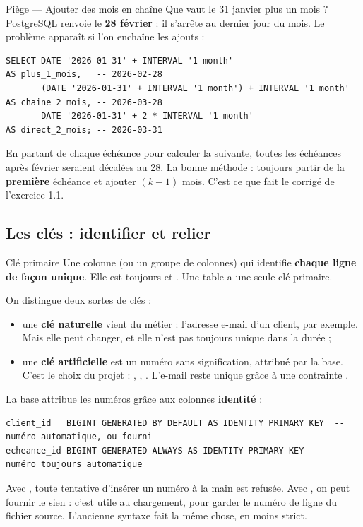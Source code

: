 \begin{piege}{Piège --- Ajouter des mois en chaîne}
Que vaut le 31 janvier plus un mois ? PostgreSQL renvoie le \textbf{28 février} : il s'arrête au
dernier jour du mois. Le problème apparaît si l'on enchaîne les ajouts :
\begin{lstlisting}[style=sql]
SELECT DATE '2026-01-31' + INTERVAL '1 month'                              AS plus_1_mois,   -- 2026-02-28
       (DATE '2026-01-31' + INTERVAL '1 month') + INTERVAL '1 month'       AS chaine_2_mois, -- 2026-03-28
       DATE '2026-01-31' + 2 * INTERVAL '1 month'                          AS direct_2_mois; -- 2026-03-31
\end{lstlisting}
En partant de chaque échéance pour calculer la suivante, toutes les échéances après février seraient
décalées au 28. La bonne méthode : toujours partir de la \textbf{première} échéance et ajouter
$(k-1)$ mois. C'est ce que fait le corrigé de l'exercice 1.1.
\end{piege}

\subsection{Les clés : identifier et relier}

\begin{definition}{Clé primaire}
Une colonne (ou un groupe de colonnes) qui identifie \textbf{chaque ligne de façon unique}. Elle est
toujours  et . Une table a une seule clé primaire.
\end{definition}

On distingue deux sortes de clés :
\begin{itemize}
\item une \textbf{clé naturelle} vient du métier : l'adresse e-mail d'un client, par exemple. Mais elle
peut changer, et elle n'est pas toujours unique dans la durée ;
\item une \textbf{clé artificielle} est un numéro sans signification, attribué par la base. C'est le
choix du projet : , , . L'e-mail reste unique grâce à
une contrainte .
\end{itemize}

La base attribue les numéros grâce aux colonnes \textbf{identité} :
\begin{lstlisting}[style=sql]
client_id   BIGINT GENERATED BY DEFAULT AS IDENTITY PRIMARY KEY  -- numéro automatique, ou fourni
echeance_id BIGINT GENERATED ALWAYS AS IDENTITY PRIMARY KEY      -- numéro toujours automatique
\end{lstlisting}
Avec , toute tentative d'insérer un numéro à la main est refusée. Avec ,
on peut fournir le sien : c'est utile au chargement, pour garder le numéro de ligne du fichier source.
L'ancienne syntaxe  fait la même chose, en moins strict.

